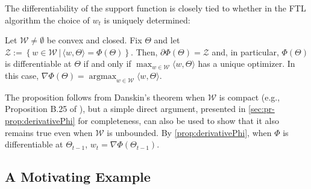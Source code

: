 \documentclass[english]{article}
\newcommand{\cZ}{\mathcal{Z}}
\newcommand{\cW}{\mathcal{W}}
\newcommand{\inpro}[2]{\langle #1, #2\rangle}
\newcommand{\ip}[1]{\langle#1\rangle}
\newcommand{\set}[2]{\left\{#1 \,\vert\, #2 \right\}}
\DeclareMathOperator*{\argmax}{argmax}
\begin{document}
The differentiability of the support function is closely tied to whether in the FTL algorithm the choice of $w_t$ is
uniquely determined:
\begin{proposition} 
\label{prop:derivativePhi}
Let $\cW\ne \emptyset$ be convex and closed.
Fix $\Theta$ and let $\cZ:= \set{w\in \cW}{\inpro{w}{\Theta} =  \Phi(\Theta) }$.
Then, $\partial \Phi(\Theta) = \cZ$ and, in particular,
$\Phi(\Theta)$ is differentiable at $\Theta$ if and only if 
$\max_{w\in\cW} \inpro{w}{\Theta}$ has a unique optimizer.
In this case, $\nabla \Phi(\Theta) = \argmax_{w\in \cW} \ip{w,\Theta}$.
\end{proposition}
The proposition follows from Danskin's theorem when $\cW$ is compact
(e.g., Proposition B.25 of \citealt{bertsekas99nonlinear}), 
but a simple
direct argument, presented in \cref{sec:pr-prop:derivativePhi} for completeness, can also be used to show that it also remains true even when $\cW$ is unbounded.
By \cref{prop:derivativePhi},
when $\Phi$ is differentiable at $\Theta_{t-1}$,
$w_t = \nabla \Phi(\Theta_{t-1})$.

\subsection{A Motivating Example}
\label{sec:FTLstoch}
\end{document}

